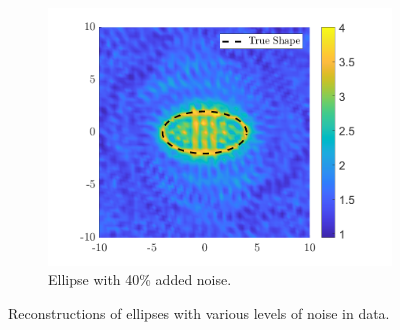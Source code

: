 \documentclass[]{article}
\begin{document}
\begin{figure}[h]
\begin{subfigure}{.3\textwidth}
					\centering
					\includegraphics[width = \textwidth]{Numeric Simulations/Images/ellipse-40-noise-reconstructed}
					\caption{Ellipse with 40\% added noise.}
				\end{subfigure}
				\caption{Reconstructions of ellipses with various levels of noise in data.}
				\label{fig:ellipsenoise}
			\end{figure}
\end{document}
